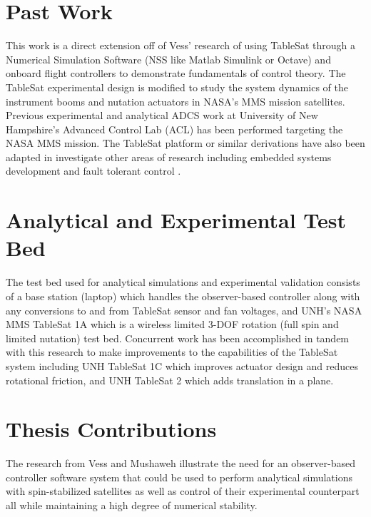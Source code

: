 \section{Past Work}
\label{sec:PastWork}

This work is a direct extension off of Vess' research \cite{vessthesis} of using TableSat through a Numerical Simulation Software (NSS like Matlab Simulink or Octave) and onboard flight controllers to demonstrate fundamentals of control theory.  The TableSat experimental design is modified to study the system dynamics of the instrument booms and nutation actuators in NASA's MMS mission satellites.  Previous experimental \cite{tsat1b} \cite{tsat1c} \cite{tsat2} and analytical \cite{mushawehthesis} ADCS work at University of New Hampshire's Advanced Control Lab (ACL) has been performed targeting the NASA MMS mission.  The TableSat platform or similar derivations have also been adapted in investigate other areas of research including embedded systems development \cite{tablesat_xuml} and fault tolerant control \cite{tablesat_object_bench} \cite{nanjing_university}.


\section{Analytical and Experimental Test Bed}
\label{sec:AnalyticalandExperimentalTestbed}

The test bed used for analytical simulations and experimental validation consists of a base station (laptop) which handles the observer-based controller along with any conversions to and from TableSat sensor and fan voltages, and UNH's NASA MMS TableSat 1A which is a wireless limited 3-DOF rotation (full spin and limited nutation) test bed.  Concurrent work has been accomplished in tandem with this research to make improvements to the capabilities of the TableSat system including UNH TableSat 1C \cite{tsat1c} which improves actuator design and reduces rotational friction, and UNH TableSat 2 \cite{tsat2} which adds translation in a plane.

\section{Thesis Contributions}
\label{sec:ThesisContributions}

The research from Vess and Mushaweh illustrate the need for an observer-based controller software system that could be used to perform analytical simulations with spin-stabilized satellites as well as control of their experimental counterpart all while maintaining a high degree of numerical stability.

